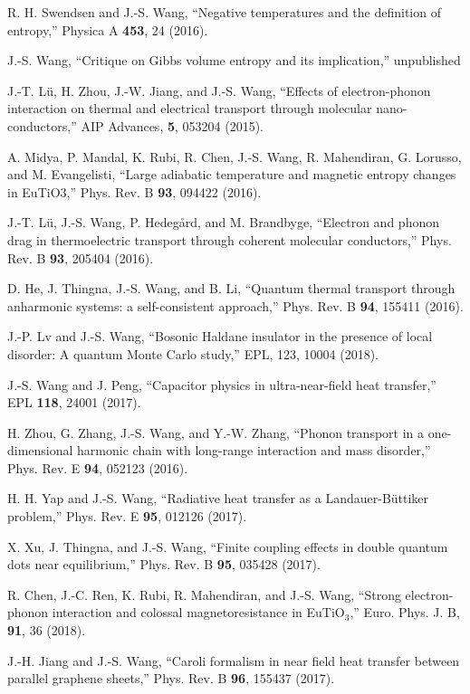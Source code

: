 \itm R. H. Swendsen and J.-S. Wang, 
``Negative temperatures and the definition of entropy,'' 
Physica A {\bf 453}, 24 (2016). 

\itm J.-S. Wang, ``Critique on Gibbs volume entropy and its implication,'' unpublished

\itm J.-T. L\"u, H. Zhou, J.-W. Jiang, and J.-S. Wang, 
``Effects of electron-phonon interaction on thermal and electrical 
transport through molecular nano-conductors,'' 
AIP Advances, {\bf 5}, 053204 (2015). 

\itm A. Midya, P. Mandal, K. Rubi, R. Chen, J.-S. Wang, R. Mahendiran, G. Lorusso, and M. Evangelisti, 
``Large adiabatic temperature and magnetic entropy changes in EuTiO3,'' Phys. Rev. B {\bf 93}, 094422 (2016). 

\itm J.-T. L\"u, J.-S. Wang, P. Hedeg\aa rd, and M. Brandbyge,
 ``Electron and phonon drag in thermoelectric transport through coherent molecular conductors,''
Phys. Rev. B {\bf 93}, 205404 (2016). 

\itm D. He, J. Thingna, J.-S. Wang, and B. Li, 
``Quantum thermal transport through anharmonic systems: a self-consistent approach,'' 
Phys. Rev. B {\bf 94}, 155411 (2016). 

\itm J.-P. Lv and J.-S. Wang, ``Bosonic Haldane insulator in the presence of local disorder: A quantum Monte Carlo study,'' 
 EPL, {123}, 10004 (2018). 

\itm J.-S. Wang and J. Peng, ``Capacitor physics in ultra-near-field heat transfer,'' EPL {\bf 118}, 24001 (2017). 

\itm H. Zhou, G. Zhang, J.-S. Wang, and Y.-W. Zhang, 
``Phonon transport in a one-dimensional harmonic chain with long-range interaction and mass disorder,''
 Phys. Rev. E {\bf 94}, 052123 (2016). 

\itm H. H. Yap and J.-S. Wang, ``Radiative heat transfer as a Landauer-Büttiker problem,''
 Phys. Rev. E {\bf 95}, 012126 (2017).
 
\itm  X. Xu, J. Thingna, and J.-S. Wang,
 ``Finite coupling effects in double quantum dots near equilibrium,''
 Phys. Rev. B {\bf 95}, 035428 (2017). 

\itm R. Chen, J.-C. Ren, K. Rubi, R. Mahendiran, and J.-S. Wang,
 ``Strong electron-phonon interaction and colossal magnetoresistance in EuTiO$_3$,''
Euro. Phys. J. B, {\bf 91}, 36 (2018). 

\itm J.-H. Jiang and J.-S. Wang, ``Caroli formalism in near field heat transfer between parallel graphene sheets,'' 
Phys. Rev. B  {\bf 96}, 155437 (2017). 

